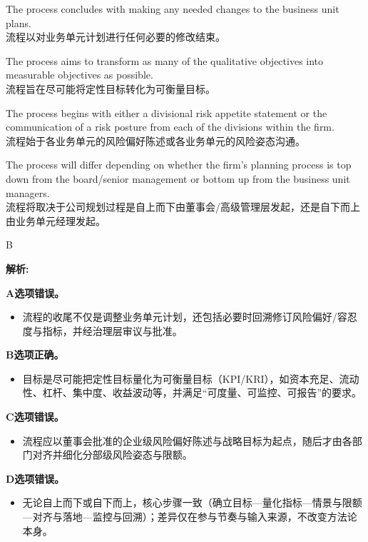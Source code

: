 \documentclass{article}
\newenvironment{explanation}
{\textbf{解析:}\par}
{\par}
\begin{document}
\begin{choices}
    \item The process concludes with making any needed changes to the business unit plans.\\流程以对业务单元计划进行任何必要的修改结束。
    \item The process aims to transform as many of the qualitative objectives into measurable objectives as possible.\\流程旨在尽可能将定性目标转化为可衡量目标。
    \item The process begins with either a divisional risk appetite statement or the communication of a risk posture from each of the divisions within the firm.\\流程始于各业务单元的风险偏好陈述或各业务单元的风险姿态沟通。
    \item The process will differ depending on whether the firm's planning process is top down from the board/senior management or bottom up from the business unit managers.\\流程将取决于公司规划过程是自上而下由董事会/高级管理层发起，还是自下而上由业务单元经理发起。
\end{choices}

\begin{correctanswer}
    B
\end{correctanswer}

\begin{explanation}
    \textbf{A选项错误。}
    \begin{itemize}
        \item 流程的收尾不仅是调整业务单元计划，还包括必要时回溯修订风险偏好/容忍度与指标，并经治理层审议与批准。
    \end{itemize}

    \textbf{B选项正确。}
    \begin{itemize}
        \item 目标是尽可能把定性目标量化为可衡量目标（KPI/KRI），如资本充足、流动性、杠杆、集中度、收益波动等，并满足“可度量、可监控、可报告”的要求。
    \end{itemize}

    \textbf{C选项错误。}
    \begin{itemize}
        \item 流程应以董事会批准的企业级风险偏好陈述与战略目标为起点，随后才由各部门对齐并细化分部级风险姿态与限额。
    \end{itemize}

    \textbf{D选项错误。}
    \begin{itemize}
        \item 无论自上而下或自下而上，核心步骤一致（确立目标—量化指标—情景与限额—对齐与落地—监控与回溯）；差异仅在参与节奏与输入来源，不改变方法论本身。
    \end{itemize}
\end{explanation}
\end{document}

